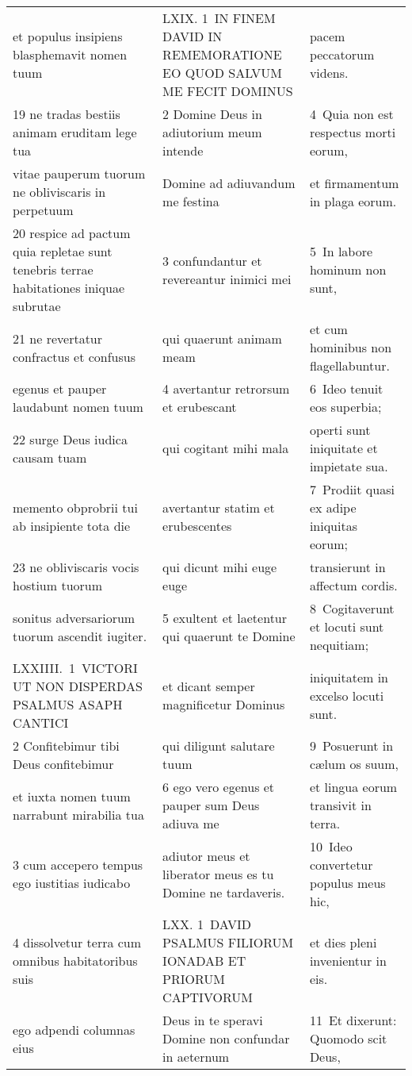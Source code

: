 \documentclass{article}
\begin{document}
\begin{longtable}{@{}p{}p{}p{}@{}}
et populus insipiens blasphemavit nomen tuum	&	LXIX. 1 IN FINEM DAVID IN REMEMORATIONE EO QUOD SALVUM ME FECIT DOMINUS	&	pacem peccatorum videns.	\\
19 ne tradas bestiis animam eruditam lege tua	&	2 Domine Deus in adiutorium meum intende	&	4 Quia non est respectus morti eorum,	\\
vitae pauperum tuorum ne obliviscaris in perpetuum	&	Domine ad adiuvandum me festina	&	et firmamentum in plaga eorum.	\\
20 respice ad pactum quia repletae sunt tenebris terrae habitationes iniquae subrutae	&	3 confundantur et revereantur inimici mei	&	5 In labore hominum non sunt,	\\
21 ne revertatur confractus et confusus	&	qui quaerunt animam meam	&	et cum hominibus non flagellabuntur.	\\
egenus et pauper laudabunt nomen tuum	&	4 avertantur retrorsum et erubescant	&	6 Ideo tenuit eos superbia;	\\
22 surge Deus iudica causam tuam	&	qui cogitant mihi mala	&	operti sunt iniquitate et impietate sua.	\\
memento obprobrii tui ab insipiente tota die	&	avertantur statim et erubescentes	&	7 Prodiit quasi ex adipe iniquitas eorum;	\\
23 ne obliviscaris vocis hostium tuorum	&	qui dicunt mihi euge euge	&	transierunt in affectum cordis.	\\
sonitus adversariorum tuorum ascendit iugiter.	&	5 exultent et laetentur qui quaerunt te Domine	&	8 Cogitaverunt et locuti sunt nequitiam;	\\
LXXIIII. 1 VICTORI UT NON DISPERDAS PSALMUS ASAPH CANTICI	&	et dicant semper magnificetur Dominus	&	iniquitatem in excelso locuti sunt.	\\
2 Confitebimur tibi Deus confitebimur	&	qui diligunt salutare tuum	&	9 Posuerunt in cælum os suum,	\\
et iuxta nomen tuum narrabunt mirabilia tua	&	6 ego vero egenus et pauper sum Deus adiuva me	&	et lingua eorum transivit in terra.	\\
3 cum accepero tempus ego iustitias iudicabo	&	adiutor meus et liberator meus es tu Domine ne tardaveris.	&	10 Ideo convertetur populus meus hic,	\\
4 dissolvetur terra cum omnibus habitatoribus suis	&	LXX. 1 DAVID PSALMUS FILIORUM IONADAB ET PRIORUM CAPTIVORUM	&	et dies pleni invenientur in eis.	\\
ego adpendi columnas eius	&	Deus in te speravi Domine non confundar in aeternum	&	11 Et dixerunt: Quomodo scit Deus,	\\

\end{longtable}
\end{document}
